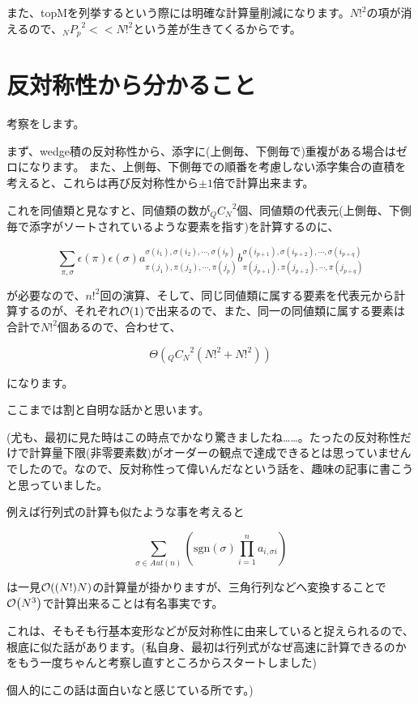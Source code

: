 \documentclass[a4paper, 10pt, dvipdfmx]{jlreq}
\begin{document}
また、topMを列挙するという際には明確な計算量削減になります。${N!}^2$の項が消えるので、${{}_N P_p}^2 << {N!}^2$という差が生きてくるからです。

\section{反対称性から分かること}

考察をします。

まず、wedge積の反対称性から、添字に(上側毎、下側毎で)重複がある場合はゼロになります。
また、上側毎、下側毎での順番を考慮しない添字集合の直積を考えると、これらは再び反対称性から$\pm 1$倍で計算出来ます。

これを同値類と見なすと、同値類の数が${{}_Q C_N}^2$個、同値類の代表元(上側毎、下側毎で添字がソートされているような要素を指す)を計算するのに、

$$
    \sum_{\pi, \sigma}\epsilon(\pi)\epsilon(\sigma)a_{\pi(j_{1}), \pi(j_{2}), \cdots, \pi(j_{p}) }^{ \sigma(i_{1}), \sigma(i_{2}), \cdots, \sigma(i_{p})}b_{\pi(j_{p+1}), \pi(j_{p+2}), \cdots, \pi(j_{p+q}) }^{ \sigma(i_{p+1}), \sigma(i_{p+2}), \cdots, \sigma(i_{p+q})}
$$

が必要なので、${n!}^2$回の演算、そして、同じ同値類に属する要素を代表元から計算するのが、それぞれ$\order{1}$で出来るので、また、同一の同値類に属する要素は合計で${N!}^2$個あるので、合わせて、

$$
    \Theta\left({{}_Q C_N}^2\left({N!}^2+{N!}^2\right)\right)
$$

になります。

ここまでは割と自明な話かと思います。

(尤も、最初に見た時はこの時点でかなり驚きましたね……。たったの反対称性だけで計算量下限(非零要素数)がオーダーの観点で達成できるとは思っていませんでしたので。なので、反対称性って偉いんだなという話を、趣味の記事に書こうと思っていました。

例えば行列式の計算も似たような事を考えると

$$
    \sum_{\sigma \in Aut(n)}{\left(\mathrm{sgn}(\sigma)\prod_{i=1}^{n}{a_{i,\sigma{i}}}\right)}
$$

は一見$\order{(N!)N}$の計算量が掛かりますが、三角行列などへ変換することで$\order{N^3}$で計算出来ることは有名事実です。

これは、そもそも行基本変形などが反対称性に由来していると捉えられるので、根底に似た話があります。(私自身、最初は行列式がなぜ高速に計算できるのかをもう一度ちゃんと考察し直すところからスタートしました)

個人的にこの話は面白いなと感じている所です。)
\end{document}
